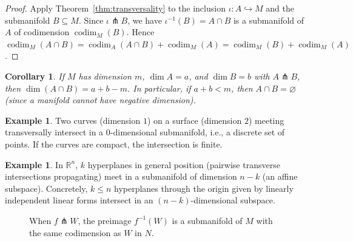 \documentclass[12pt,a4paper,openany]{book}
\newtheorem{corollary}[theorem]{Corollary}
\theoremstyle{definition}
\newtheorem{example}[theorem]{Example}
\theoremstyle{remark}
\newcommand{\R}{\mathbb{R}}
\begin{document}
\begin{proof}
Apply Theorem~\ref{thm:transversality} to the inclusion
$\iota \colon A \hookrightarrow M$ and the submanifold $B \subseteq M$.
Since $\iota \pitchfork B$, we have $\iota^{-1}(B) = A \cap B$ is a
submanifold of $A$ of codimension $\operatorname{codim}_M(B)$. Hence
$\operatorname{codim}_M(A \cap B) = \operatorname{codim}_A(A \cap B)
+ \operatorname{codim}_M(A) = \operatorname{codim}_M(B) + \operatorname{codim}_M(A)$.
\end{proof}

\begin{corollary}\label{cor:dimension-formula}
If $M$ has dimension $m$, $\dim A = a$, and $\dim B = b$ with $A \pitchfork B$,
then $\dim(A \cap B) = a + b - m$. In particular, if $a + b < m$, then
$A \cap B = \varnothing$ (since a manifold cannot have negative dimension).
\end{corollary}

\begin{example}\label{ex:transverse-curves-surface}
Two curves (dimension $1$) on a surface (dimension $2$) meeting
transversally intersect in a $0$-dimensional submanifold, i.e., a
discrete set of points. If the curves are compact, the intersection
is finite.
\end{example}

\begin{example}\label{ex:transverse-hyperplanes}
In $\R^n$, $k$ hyperplanes in general position (pairwise transverse
intersections propagating) meet in a submanifold of dimension $n - k$
(an affine subspace). Concretely, $k \leq n$ hyperplanes through the
origin given by linearly independent linear forms intersect in an
$(n-k)$-dimensional subspace.
\end{example}

\begin{figure}[ht]
\centering
{}
\caption{When $f \pitchfork W$, the preimage $f^{-1}(W)$ is a submanifold
  of $M$ with the same codimension as $W$ in $N$.}
\label{fig:transverse-preimage}
\end{figure}
\end{document}

